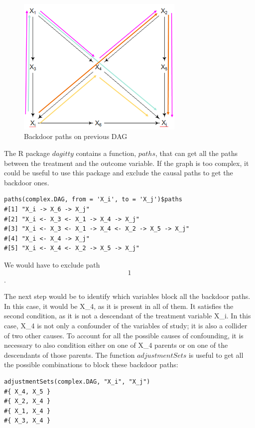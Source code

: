 \documentclass{article}
\begin{document}
\begin{figure}[h]
\caption{Backdoor paths on previous DAG}
\includegraphics[width=8cm]{complex.DAG.arrows.png}
\centering
\end{figure}
The R package \(dagitty\) contains a function, \(paths\), that can get all the paths between the treatment and the outcome variable. If the graph is too complex, it could be useful to use this package and exclude the causal paths to get the backdoor ones.\par
\begin{lstlisting}
paths(complex.DAG, from = 'X_i', to = 'X_j')$paths
#[1] "X_i -> X_6 -> X_j"                            
#[2] "X_i <- X_3 <- X_1 -> X_4 -> X_j"              
#[3] "X_i <- X_3 <- X_1 -> X_4 <- X_2 -> X_5 -> X_j"
#[4] "X_i <- X_4 -> X_j"                            
#[5] "X_i <- X_4 <- X_2 -> X_5 -> X_j"
\end{lstlisting}
We would have to exclude path \[1\].\par
The next step would be to identify which variables block all the backdoor paths. In this case, it would be X\_4, as it is present in all of them. It satisfies the second condition, as it is not a descendant of the treatment variable X\_i. In this case, X\_4 is not only a confounder of the variables of study; it is also a collider of two other causes. To account for all the possible causes of confounding, it is necessary to also condition either on one of X\_4 parents or on one of the descendants of those parents. The function \(adjustmentSets\) is useful to get all the possible combinations to block these backdoor paths:\par

\begin{lstlisting}
adjustmentSets(complex.DAG, "X_i", "X_j")
#{ X_4, X_5 }
#{ X_2, X_4 }
#{ X_1, X_4 }
#{ X_3, X_4 }
\end{lstlisting}
\end{document}
